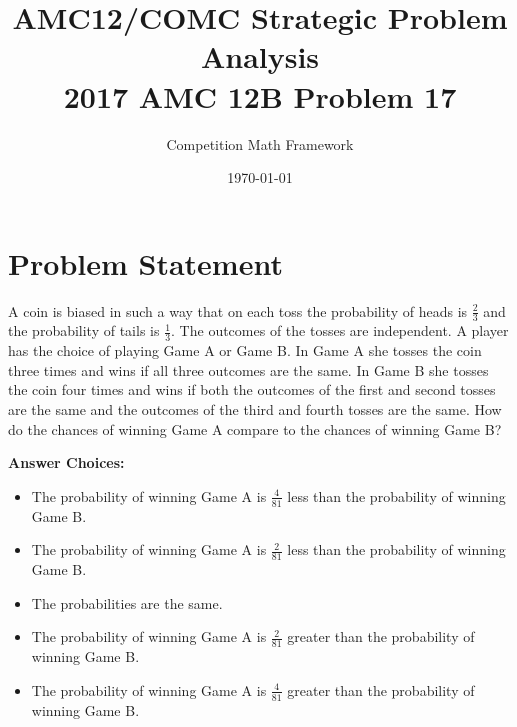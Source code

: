 \documentclass[]{article}
\begin{document}
\title{\textbf{AMC12/COMC Strategic Problem Analysis\\2017 AMC 12B Problem 17}}
\author{Competition Math Framework}
\date{\today}
\maketitle

\section*{Problem Statement}
A coin is biased in such a way that on each toss the probability of heads is $\frac{2}{3}$ and the probability of tails is $\frac{1}{3}$. The outcomes of the tosses are independent. A player has the choice of playing Game A or Game B. In Game A she tosses the coin three times and wins if all three outcomes are the same. In Game B she tosses the coin four times and wins if both the outcomes of the first and second tosses are the same and the outcomes of the third and fourth tosses are the same. How do the chances of winning Game A compare to the chances of winning Game B?

\textbf{Answer Choices:}
\begin{itemize}
    \item[\textbf{(A)}] The probability of winning Game A is $\frac{4}{81}$ less than the probability of winning Game B.
    \item[\textbf{(B)}] The probability of winning Game A is $\frac{2}{81}$ less than the probability of winning Game B.
    \item[\textbf{(C)}] The probabilities are the same.
    \item[\textbf{(D)}] The probability of winning Game A is $\frac{2}{81}$ greater than the probability of winning Game B.
    \item[\textbf{(E)}] The probability of winning Game A is $\frac{4}{81}$ greater than the probability of winning Game B.
\end{itemize}
\end{document}
